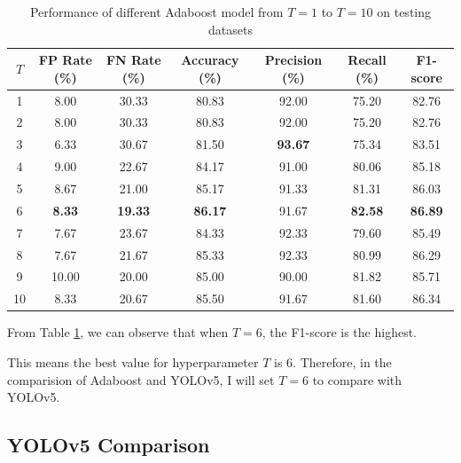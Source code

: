\documentclass{article}[12pt]
\begin{document}
\begin{table}[H]
    \centering
    \caption{Performance of different Adaboost model from $T=1$ to $T=10$ on testing datasets}
    \begin{tabular}{@{}ccccccc@{}}
        \toprule
        $T$  & FP Rate (\%)  & FN Rate (\%)   & Accuracy (\%)  & Precision (\%)   & Recall (\%)      & F1-score  \\ \midrule
        1  & 8.00          & 30.33          & 80.83          & 92.00         & 75.20         & 82.76         \\
        2  & 8.00          & 30.33          & 80.83          & 92.00         & 75.20         & 82.76         \\
        3  & 6.33          & 30.67          & 81.50          & \textbf{93.67} & 75.34         & 83.51         \\
        4  & 9.00          & 22.67          & 84.17          & 91.00         & 80.06         & 85.18         \\
        5  & 8.67          & 21.00          & 85.17          & 91.33         & 81.31         & 86.03         \\
        6  & \textbf{8.33} & \textbf{19.33} & \textbf{86.17} & 91.67         & \textbf{82.58} & \textbf{86.89} \\
        7  & 7.67          & 23.67          & 84.33          & 92.33         & 79.60         & 85.49         \\
        8  & 7.67          & 21.67          & 85.33          & 92.33         & 80.99         & 86.29         \\
        9  & 10.00         & 20.00          & 85.00          & 90.00         & 81.82         & 85.71         \\
        10 & 8.33          & 20.67          & 85.50          & 91.67         & 81.60         & 86.34         \\ \bottomrule
    \end{tabular}
    \label{tab:ada_test}    
\end{table}

From Table \ref{tab:ada_test}, we can observe that when $T=6$, the F1-score is the highest.

This means the best value for hyperparameter $T$ is 6. Therefore, in the comparision of Adaboost
and YOLOv5, I will set $T=6$ to compare with YOLOv5.
\subsection{YOLOv5 Comparison} \label{subsec:yolo_comp}
\end{document}
